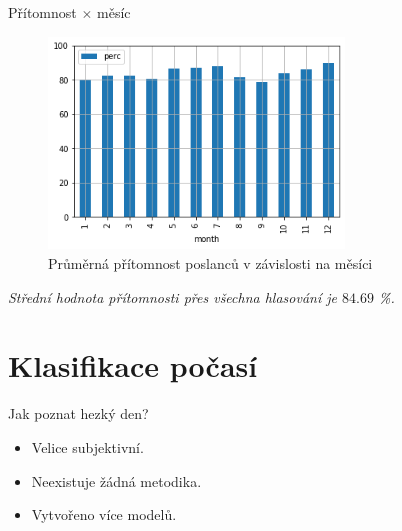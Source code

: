 \documentclass[10pt]{beamer}
\begin{document}
\begin{frame}{Přítomnost $\times$ měsíc}
    \begin{figure}
        \centering
        \includegraphics[width=0.7\textwidth]{att_per_month.png}
        \caption{Průměrná přítomnost poslanců v závislosti na měsíci}
        \label{fig:my_label}
    \end{figure}
    
    \emph{Střední hodnota přítomnosti přes všechna hlasování je $84.69$ \%.}
\end{frame}

\section{Klasifikace počasí}

\begin{frame}{Jak poznat hezký den?}
    \begin{itemize}
        \item Velice subjektivní.
        \item Neexistuje žádná metodika.
        \item Vytvořeno více modelů.
    \end{itemize}
\end{frame}
\end{document}
